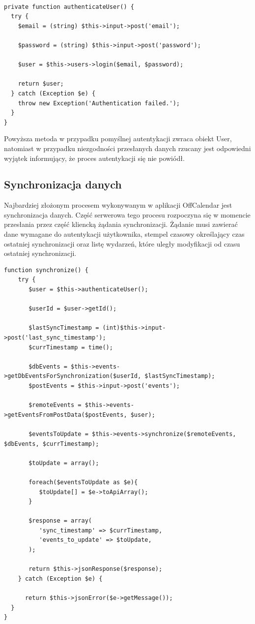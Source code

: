 \begin{lstlisting}[caption=Rejestracja użytkowników przy użyciu metody register interfejsu Users\_api., label=amb, captionpos=b]

private function authenticateUser() {
  try {
	$email = (string) $this->input->post('email');

	$password = (string) $this->input->post('password');

	$user = $this->users->login($email, $password);

    return $user;
  } catch (Exception $e) {
	throw new Exception('Authentication failed.');
  }
}

\end{lstlisting}

Powyższa metoda w przypadku pomyślnej autentykacji zwraca obiekt User, natomiast w przypadku niezgodności przesłanych danych rzucany jest odpowiedni wyjątek informujący, że proces autentykacji się nie powiódł.

\subsection{Synchronizacja danych}
\label{serwSynDanych}

Najbardziej złożonym procesem wykonywanym w aplikacji OffCalendar jest synchronizacja danych. Część serwerowa tego procesu rozpoczyna się w momencie przesłania przez część kliencką żądania synchronizacji. Żądanie musi zawierać dane wymagane do autentykacji użytkownika, stempel czasowy określający czas ostatniej synchronizacji oraz listę wydarzeń, które uległy modyfikacji od czasu ostatniej synchronizacji.

\begin{lstlisting}[caption=Metoda synchronize interfejsu programowania Events\_api., label=amb, captionpos=b]
function synchronize() {
   	try {
	   $user = $this->authenticateUser();

       $userId = $user->getId();

       $lastSyncTimestamp = (int)$this->input->post('last_sync_timestamp');
       $currTimestamp = time();

       $dbEvents = $this->events->getDbEventsForSynchronization($userId, $lastSyncTimestamp);       	 
       $postEvents = $this->input->post('events');

       $remoteEvents = $this->events->getEventsFromPostData($postEvents, $user);
      	 
       $eventsToUpdate = $this->events->synchronize($remoteEvents, $dbEvents, $currTimestamp);

       $toUpdate = array();
       	 
       foreach($eventsToUpdate as $e){
          $toUpdate[] = $e->toApiArray();
       }

       $response = array(
          'sync_timestamp' => $currTimestamp,
          'events_to_update' => $toUpdate,
       );

       return $this->jsonResponse($response);
    } catch (Exception $e) {

      return $this->jsonError($e->getMessage());
  }
}

\end{lstlisting}

